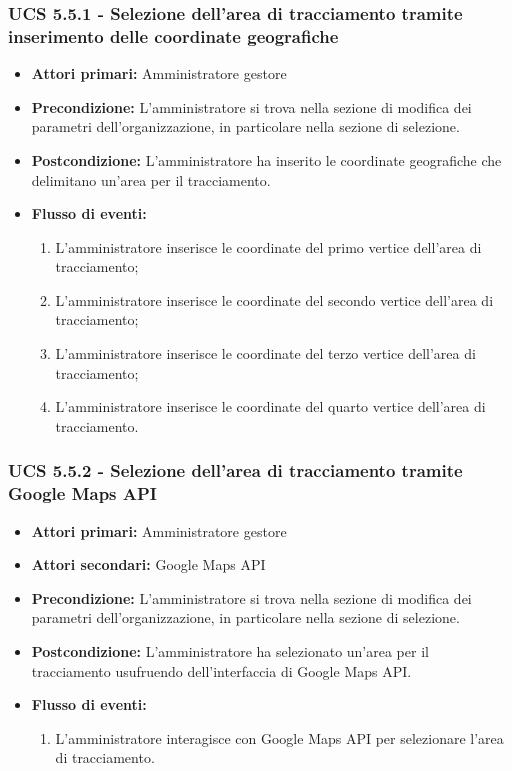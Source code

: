 \subsubsection{UCS 5.5.1 - Selezione dell'area di tracciamento tramite inserimento delle coordinate geografiche}%
\begin{itemize}
\item \textbf{Attori primari:} Amministratore gestore
\item \textbf{Precondizione:} L'amministratore si trova nella sezione di modifica dei parametri dell'organizzazione, in particolare nella sezione di selezione.
\item \textbf{Postcondizione:} L'amministratore ha inserito le coordinate geografiche che delimitano un'area per il tracciamento.
\item \textbf{Flusso di eventi:}
\begin{enumerate}
    \item L'amministratore inserisce le coordinate del primo vertice dell'area di tracciamento;
    \item L'amministratore inserisce le coordinate del secondo vertice dell'area di tracciamento;
    \item L'amministratore inserisce le coordinate del terzo vertice dell'area di tracciamento;
    \item L'amministratore inserisce le coordinate del quarto vertice dell'area di tracciamento.
\end{enumerate}
\end{itemize}

\subsubsection{UCS 5.5.2 - Selezione dell'area di tracciamento tramite Google Maps API}%
\begin{itemize}
\item \textbf{Attori primari:} Amministratore gestore
\item \textbf{Attori secondari:} Google Maps API
\item \textbf{Precondizione:} L'amministratore si trova nella sezione di modifica dei parametri dell'organizzazione, in particolare nella sezione di selezione.
\item \textbf{Postcondizione:} L'amministratore ha selezionato un'area per il tracciamento usufruendo dell'interfaccia di Google Maps API.
\item \textbf{Flusso di eventi:}
\begin{enumerate}
    \item L'amministratore interagisce con Google Maps API per selezionare l'area di tracciamento.
\end{enumerate}
\end{itemize}